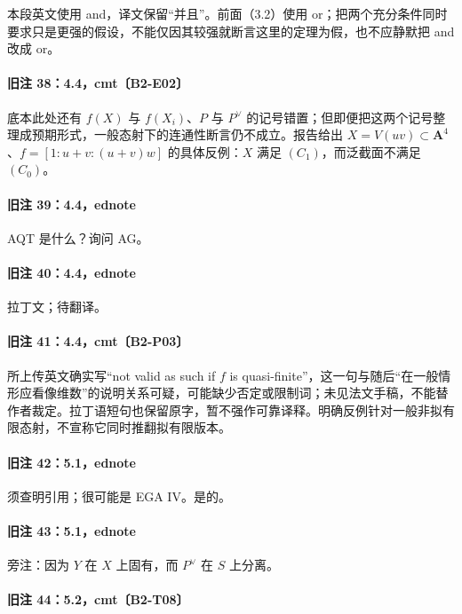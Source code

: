 本段英文使用 and，译文保留“并且”。前面（3.2）使用 or；把两个充分条件同时要求只是更强的假设，不能仅因其较强就断言这里的定理为假，也不应静默把 and 改成 or。

\paragraph{旧注 38：4.4，cmt〔B2-E02〕}

底本此处还有 $f(X)$ 与 $f(X_i)$、$P$ 与 $P^\vee$ 的记号错置；但即便把这两个记号整理成预期形式，一般态射下的连通性断言仍不成立。报告给出 $X=V(uv)\subset\mathbf A^4$、$f=[1:u+v:(u+v)w]$ 的具体反例：$X$ 满足 $(C_1)$，而泛截面不满足 $(C_0)$。

\paragraph{旧注 39：4.4，ednote}

AQT 是什么？询问 AG。

\paragraph{旧注 40：4.4，ednote}

拉丁文；待翻译。

\paragraph{旧注 41：4.4，cmt〔B2-P03〕}

所上传英文确实写“not valid as such if $f$ is quasi-finite”，这一句与随后“在一般情形应看像维数”的说明关系可疑，可能缺少否定或限制词；未见法文手稿，不能替作者裁定。拉丁语短句也保留原字，暂不强作可靠译释。明确反例针对一般非拟有限态射，不宣称它同时推翻拟有限版本。

\paragraph{旧注 42：5.1，ednote}

须查明引用；很可能是 EGA IV。是的。

\paragraph{旧注 43：5.1，ednote}

旁注：因为 $Y$ 在 $X$ 上固有，而 $P^\vee$ 在 $S$ 上分离。

\paragraph{旧注 44：5.2，cmt〔B2-T08〕}

